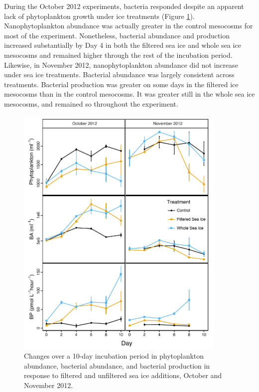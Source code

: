During the October 2012 experiments, bacteria responded despite an apparent lack of phytoplankton growth under ice treatments (Figure \ref{fig:ch5:exp2013}). Nanophytoplankton abundance was actually greater in the control mesocosms for most of the experiment. Nonetheless, bacterial abundance and production increased substantially by Day 4 in both the filtered sea ice and whole sea ice mesocosms and remained higher through the rest of the incubation period. Likewise, in November 2012, nanophytoplankton abundance did not increase under sea ice treatments. Bacterial abundance was largely consistent across treatments. Bacterial production was greater on some days in the filtered ice mesocosms than in the control mesocosms. It was greater still in the whole sea ice mesocosms, and remained so throughout the experiment.

\begin{figure}[htbp] 
\centering 
\includegraphics[width=0.9\textwidth]{Chapter_6_SeaIce/Figures/Experiments_2012}
\caption{Changes over a 10-day incubation period in phytoplankton abundance, bacterial abundance, and bacterial production in response to filtered and unfiltered sea ice additions, October and November 2012.} 
\label{fig:ch5:exp2013} 
\end{figure}

